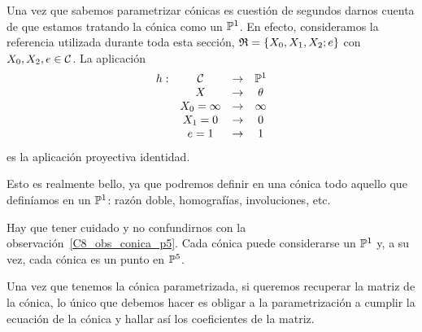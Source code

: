 \begin{obs}
	Una vez que sabemos parametrizar cónicas es cuestión de segundos darnos cuenta de que estamos tratando la cónica como un $\mathbb{P}^1$. En efecto, consideramos la referencia utilizada durante toda esta sección, $\mathfrak{R}=\{X_0,X_1,X_2;e\}$ con $X_0,X_2,e\in \mathcal{C}$. La aplicación
	\[\begin{array}{cccc}
		h:& \mathcal{C}&\rightarrow &\mathbb{P}^1\\
		&X&\rightarrow &\theta\\
		&X_0=\infty&\rightarrow &\infty\\
		&X_1=0&\rightarrow &0\\
		&e=1&\rightarrow &1\\
	\end{array}\]
	es la aplicación proyectiva identidad.
	
	Esto es realmente bello, ya que podremos definir en una cónica todo aquello que definíamos en un $\mathbb{P}^1$: razón doble, homografías, involuciones, etc.
	
	Hay que tener cuidado y no confundirnos con la observación~\ref{C8_obs_conica_p5}. Cada cónica puede considerarse un $\mathbb{P}^1$ y, a su vez, cada cónica es un punto en $\mathbb{P}^5$.
\end{obs}
\begin{obs}
	Una vez que tenemos la cónica parametrizada, si queremos recuperar la matriz de la cónica, lo único que debemos hacer es obligar a la parametrización a cumplir la ecuación de la cónica y hallar así los coeficientes de la matriz.
\end{obs}

